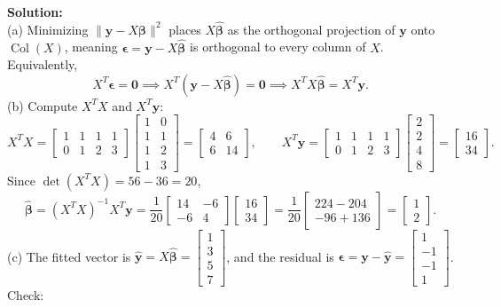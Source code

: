 \documentclass[11pt, letterpaper]{article}
\theoremstyle{definition}
\theoremstyle{remark}
\begin{document}
\textbf{Solution:} \\
(a) Minimizing $\|\mathbf{y} - X\boldsymbol{\beta}\|^2$ places $X\hat{\boldsymbol{\beta}}$ as the orthogonal projection of $\mathbf{y}$ onto $\operatorname{Col}(X)$, meaning $\boldsymbol{\epsilon} = \mathbf{y} - X\hat{\boldsymbol{\beta}}$ is orthogonal to every column of $X$. Equivalently,
\[
X^T \boldsymbol{\epsilon} = \mathbf{0} \implies X^T(\mathbf{y} - X\hat{\boldsymbol{\beta}}) = \mathbf{0} \implies X^T X \hat{\boldsymbol{\beta}} = X^T \mathbf{y}.
\]
(b) Compute $X^T X$ and $X^T \mathbf{y}$:
\[
X^T X = \begin{bmatrix} 1 & 1 & 1 & 1 \\ 0 & 1 & 2 & 3 \end{bmatrix}\begin{bmatrix} 1 & 0 \\ 1 & 1 \\ 1 & 2 \\ 1 & 3 \end{bmatrix} = \begin{bmatrix} 4 & 6 \\ 6 & 14 \end{bmatrix}, \qquad
X^T \mathbf{y} = \begin{bmatrix} 1 & 1 & 1 & 1 \\ 0 & 1 & 2 & 3 \end{bmatrix}\begin{bmatrix} 2 \\ 2 \\ 4 \\ 8 \end{bmatrix} = \begin{bmatrix} 16 \\ 34 \end{bmatrix}.
\]
Since $\det(X^T X) = 56 - 36 = 20$,
\[
\hat{\boldsymbol{\beta}} = (X^T X)^{-1} X^T \mathbf{y} = \frac{1}{20}\begin{bmatrix} 14 & -6 \\ -6 & 4 \end{bmatrix}\begin{bmatrix} 16 \\ 34 \end{bmatrix} = \frac{1}{20}\begin{bmatrix} 224 - 204 \\ -96 + 136 \end{bmatrix} = \begin{bmatrix} 1 \\ 2 \end{bmatrix}.
\]
(c) The fitted vector is $\hat{\mathbf{y}} = X\hat{\boldsymbol{\beta}} = \begin{bmatrix} 1 \\ 3 \\ 5 \\ 7 \end{bmatrix}$, and the residual is $\boldsymbol{\epsilon} = \mathbf{y} - \hat{\mathbf{y}} = \begin{bmatrix} 1 \\ -1 \\ -1 \\ 1 \end{bmatrix}$. Check:
\end{document}
